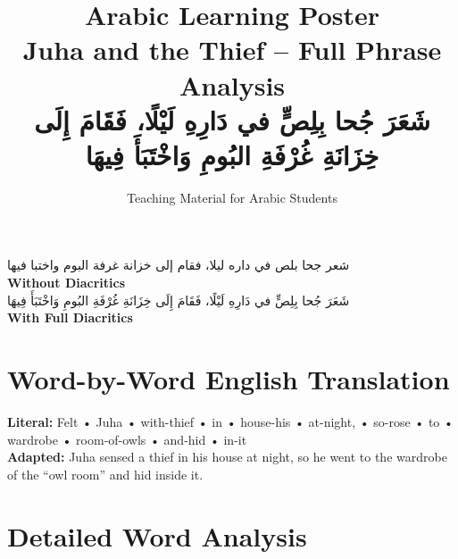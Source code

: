 \documentclass[a4paper,12pt]{article}
\begin{document}
\title{\textbf{\Large Arabic Learning Poster}\\
\large Juha and the Thief – Full Phrase Analysis\\
\normalsize \textarabic{شَعَرَ جُحا بِلِصٍّ في دَارِهِ لَيْلًا، فَقَامَ إِلَى خِزَانَةِ غُرْفَةِ البُومِ وَاخْتَبَأَ فِيهَا}}
\author{Teaching Material for Arabic Students}
\date{}
\maketitle

\begin{tcolorbox}[colback=boxcolor,colframe=headercolor,title=\textbf{Arabic Text Analysis}]
\centering
\textarabic{شعر جحا بلص في داره ليلا، فقام إلى خزانة غرفة البوم واختبا فيها}
\\[0.5em]
\textbf{Without Diacritics}
\\[1em]
\textarabic{شَعَرَ جُحا بِلِصٍّ في دَارِهِ لَيْلًا، فَقَامَ إِلَى خِزَانَةِ غُرْفَةِ البُومِ وَاخْتَبَأَ فِيهَا}
\\[0.5em]
\textbf{With Full Diacritics}
\end{tcolorbox}

\section{Word-by-Word English Translation}
\begin{tcolorbox}[colback=white,colframe=accentcolor]
\textbf{Literal:} Felt • Juha • with-thief • in • house-his • at-night, • so-rose • to • wardrobe • room-of-owls • and-hid • in-it
\\[0.5em]
\textbf{Adapted:} Juha sensed a thief in his house at night, so he went to the wardrobe of the “owl room” and hid inside it.
\end{tcolorbox}

\section{Detailed Word Analysis}

\end{document}
